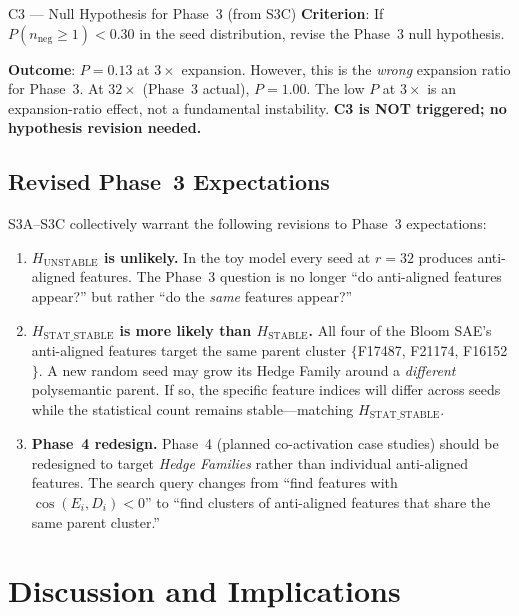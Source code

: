 \documentclass[11pt,a4paper]{article}
\newcommand{\cosED}{\cos(E_i, D_i)}
\newcommand{\nneg}{n_{\mathrm{neg}}}
\begin{document}
\begin{gatebox}{C3 --- Null Hypothesis for Phase~3 (from S3C)}
\textbf{Criterion}: If $P(\nneg{\ge}1) < 0.30$ in the seed distribution, revise
the Phase~3 null hypothesis.

\textbf{Outcome}: $P{=}0.13$ at $3\times$ expansion.  However, this is the
\emph{wrong} expansion ratio for Phase~3.  At $32\times$ (Phase~3 actual),
$P{=}1.00$.  The low $P$ at $3\times$ is an expansion-ratio effect, not a
fundamental instability.  \textbf{C3 is NOT triggered; no hypothesis revision needed.}
\end{gatebox}

\subsection{Revised Phase~3 Expectations}
\label{sec:phase3_revised}

S3A--S3C collectively warrant the following revisions to Phase~3 expectations:

\begin{enumerate}
  \item \textbf{$H_{\mathrm{UNSTABLE}}$ is unlikely.}
    In the toy model every seed at $r{=}32$ produces anti-aligned features.
    The Phase~3 question is no longer ``do anti-aligned features appear?''
    but rather ``do the \emph{same} features appear?''

  \item \textbf{$H_{\mathrm{STAT\_STABLE}}$ is more likely than $H_{\mathrm{STABLE}}$.}
    All four of the Bloom SAE's anti-aligned features target the same parent cluster
    $\{$F17487, F21174, F16152$\}$.  A new random seed may grow its Hedge Family
    around a \emph{different} polysemantic parent.  If so, the specific feature indices
    will differ across seeds while the statistical count remains stable---matching
    $H_{\mathrm{STAT\_STABLE}}$.

  \item \textbf{Phase~4 redesign.}
    Phase~4 (planned co-activation case studies) should be redesigned to target
    \emph{Hedge Families} rather than individual anti-aligned features.
    The search query changes from ``find features with $\cosED < 0$'' to
    ``find clusters of anti-aligned features that share the same parent cluster.''
\end{enumerate}

\section{Discussion and Implications}
\label{sec:discussion}
\end{document}
